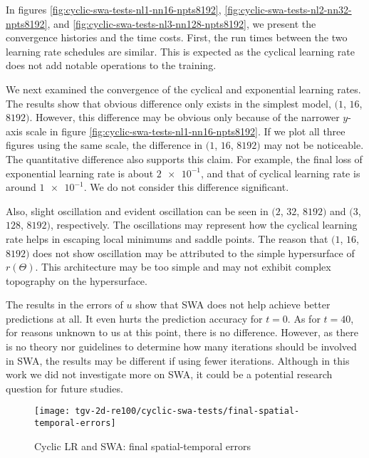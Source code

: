 In figures \ref{fig:cyclic-swa-tests-nl1-nn16-npts8192}, \ref{fig:cyclic-swa-tests-nl2-nn32-npts8192}, and \ref{fig:cyclic-swa-tests-nl3-nn128-npts8192}, we present the convergence histories and the time costs.
First, the run times between the two learning rate schedules are similar.
This is expected as the cyclical learning rate does not add notable operations to the training.

We next examined the convergence of the cyclical and exponential learning rates.
The results show that obvious difference only exists in the simplest model, $(1$, $16$, $8192)$.
However, this difference may be obvious only because of the narrower $y$-axis scale in figure \ref{fig:cyclic-swa-tests-nl1-nn16-npts8192}.
If we plot all three figures using the same scale, the difference in $(1$, $16$, $8192)$ may not be noticeable.
The quantitative difference also supports this claim.
For example, the final loss of exponential learning rate is about $\num{2e-1}$, and that of cyclical learning rate is around $\num{1e-1}$.
We do not consider this difference significant.

Also, slight oscillation and evident oscillation can be seen in $(2$, $32$, $8192)$ and $(3$, $128$, $8192)$, respectively. 
The oscillations may represent how the cyclical learning rate helps in escaping local minimums and saddle points. 
The reason that $(1$, $16$, $8192)$ does not show oscillation may be attributed to the simple hypersurface of $r(\Theta)$.
This architecture may be too simple and may not exhibit complex topography on the hypersurface.

The results in the errors of $u$ show that SWA does not help achieve better predictions at all.
It even hurts the prediction accuracy for $t=0$.
As for $t=40$, for reasons unknown to us at this point, there is no difference.
However, as there is no theory nor guidelines to determine how many iterations should be involved in SWA, the results may be different if using fewer iterations.
Although in this work we did not investigate more on SWA, it could be a potential research question for future studies.

\begin{figure}[hbt!]
    \centering%
    \texttt{[image: tgv-2d-re100/cyclic-swa-tests/final-spatial-temporal-errors]}%
    \caption[%
        Cyclic LR and SWA: final spatial-temporal errors%
    ]{%
        Cyclic LR and SWA: final spatial-temporal errors%
    }\label{fig:cyclic-swa-tests-final-sterrs}%
\end{figure}

